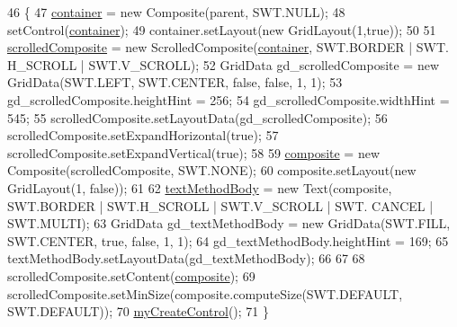 \begin{DoxyCode}
46                                                 \{
47         \hyperlink{classit_1_1isislab_1_1masonhelperdocumentation_1_1mason_1_1wizards_1_1_l___step_method_page_af82020d1675719f61ee42e85d7fb9d83}{container} = \textcolor{keyword}{new} Composite(parent, SWT.NULL);
48         setControl(\hyperlink{classit_1_1isislab_1_1masonhelperdocumentation_1_1mason_1_1wizards_1_1_l___step_method_page_af82020d1675719f61ee42e85d7fb9d83}{container});
49         container.setLayout(\textcolor{keyword}{new} GridLayout(1,\textcolor{keyword}{true}));
50         
51         \hyperlink{classit_1_1isislab_1_1masonhelperdocumentation_1_1mason_1_1wizards_1_1_l___step_method_page_adf242c4fc6634f961d3c311e4d2d6e25}{scrolledComposite} = \textcolor{keyword}{new} ScrolledComposite(\hyperlink{classit_1_1isislab_1_1masonhelperdocumentation_1_1mason_1_1wizards_1_1_l___step_method_page_af82020d1675719f61ee42e85d7fb9d83}{container}, SWT.BORDER | SWT.
      H\_SCROLL | SWT.V\_SCROLL);
52         GridData gd\_scrolledComposite = \textcolor{keyword}{new} GridData(SWT.LEFT, SWT.CENTER, \textcolor{keyword}{false}, \textcolor{keyword}{false}, 1, 1);
53         gd\_scrolledComposite.heightHint = 256;
54         gd\_scrolledComposite.widthHint = 545;
55         scrolledComposite.setLayoutData(gd\_scrolledComposite);
56         scrolledComposite.setExpandHorizontal(\textcolor{keyword}{true});
57         scrolledComposite.setExpandVertical(\textcolor{keyword}{true});
58         
59         \hyperlink{classit_1_1isislab_1_1masonhelperdocumentation_1_1mason_1_1wizards_1_1_l___step_method_page_a73ff4ee05e8c5b36aed06fa604e32ac2}{composite} = \textcolor{keyword}{new} Composite(scrolledComposite, SWT.NONE);
60         composite.setLayout(\textcolor{keyword}{new} GridLayout(1, \textcolor{keyword}{false}));
61         
62         \hyperlink{classit_1_1isislab_1_1masonhelperdocumentation_1_1mason_1_1wizards_1_1_l___step_method_page_a8dc8dfbedd4fadf1c63f825645893362}{textMethodBody} = \textcolor{keyword}{new} Text(composite, SWT.BORDER | SWT.H\_SCROLL | SWT.V\_SCROLL | SWT.
      CANCEL | SWT.MULTI);
63         GridData gd\_textMethodBody = \textcolor{keyword}{new} GridData(SWT.FILL, SWT.CENTER, \textcolor{keyword}{true}, \textcolor{keyword}{false}, 1, 1);
64         gd\_textMethodBody.heightHint = 169;
65         textMethodBody.setLayoutData(gd\_textMethodBody);
66         
67     
68         scrolledComposite.setContent(\hyperlink{classit_1_1isislab_1_1masonhelperdocumentation_1_1mason_1_1wizards_1_1_l___step_method_page_a73ff4ee05e8c5b36aed06fa604e32ac2}{composite});
69         scrolledComposite.setMinSize(composite.computeSize(SWT.DEFAULT, SWT.DEFAULT));
70         \hyperlink{classit_1_1isislab_1_1masonhelperdocumentation_1_1mason_1_1wizards_1_1_l___step_method_page_aae5b5f889fca35447959d7f5f4f264a7}{myCreateControl}();
71     \}
\end{DoxyCode}


